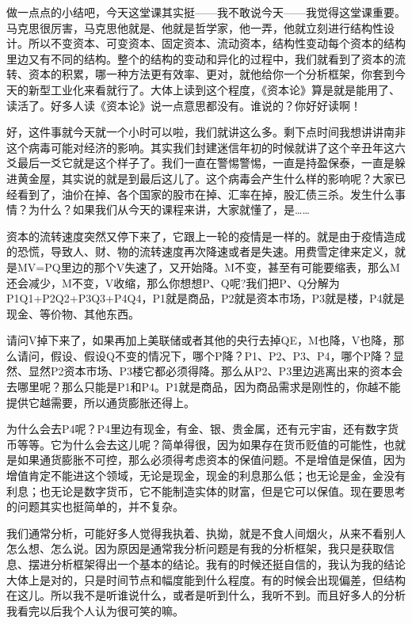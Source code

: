 \documentclass[UTF8, 12pt, a4paper]{ctexrep}
\begin{document}
做一点点的小结吧，今天这堂课其实挺——我不敢说今天——我觉得这堂课重要。马克思很厉害，马克思他就是、他就是哲学家，他一弄，他就立刻进行结构性设计。所以不变资本、可变资本、固定资本、流动资本，结构性变动每个资本的结构里边又有不同的结构。整个的结构的变动和异化的过程中，我们就看到了资本的流转、资本的积累，哪一种方法更有效率、更对，就他给你一个分析框架，你套到今天的新型工业化来看就行了。大体上读到这个程度，《资本论》算是就是能用了、读活了。好多人读《资本论》说一点意思都没有。谁说的？你好好读啊！

好，这件事就今天就一个小时可以啦，我们就讲这么多。剩下点时间我想讲讲南非这个病毒可能对经济的影响。其实我们封建迷信年初的时候就讲了这个辛丑年这六爻最后一爻它就是这个样子了。我们一直在警惕警惕，一直是持盈保泰，一直是躲进黄金屋，其实说的就是到最后这儿了。这个病毒会产生什么样的影响呢？大家已经看到了，油价在掉、各个国家的股市在掉、汇率在掉，股汇债三杀。发生什么事情？为什么？如果我们从今天的课程来讲，大家就懂了，是……

资本的流转速度突然又停下来了，它跟上一轮的疫情是一样的。就是由于疫情造成的恐慌，导致人、财、物的流转速度再次降速或者是失速。用费雪定律来定义，就是MV=PQ里边的那个V失速了，又开始降。M不变，甚至有可能要缩表，那么M还会减少，M不变，V收缩，那么你想想P、Q呢?我们把P、Q分解为P1Q1+P2Q2+P3Q3+P4Q4，P1就是商品，P2就是资本市场，P3就是楼，P4就是现金、等价物、其他东西。

请问V掉下来了，如果再加上美联储或者其他的央行去掉QE，M也降，V也降，那么请问，假设、假设Q不变的情况下，哪个P降？P1、P2、P3、P4，哪个P降？显然、显然P2资本市场、P3楼它都必须得降。那么从P2、P3里边逃离出来的资本会去哪里呢？那么只能是P1和P4。P1就是商品，因为商品需求是刚性的，你越不能提供它越需要，所以通货膨胀还得上。

为什么会去P4呢？P4里边有现金，有金、银、贵金属，还有元宇宙，还有数字货币等等。它为什么会去这儿呢？简单得很，因为如果存在货币贬值的可能性，也就是如果通货膨胀不可控，那么必须得考虑资本的保值问题。不是增值是保值，因为增值肯定不能进这个领域，无论是现金，现金的利息那么低；也无论是金，金没有利息；也无论是数字货币，它不能制造实体的财富，但是它可以保值。现在要思考的问题其实也挺简单的，并不复杂。

我们通常分析，可能好多人觉得我执着、执拗，就是不食人间烟火，从来不看别人怎么想、怎么说。因为原因是通常我分析问题是有我的分析框架，我只是获取信息、摆进分析框架得出一个基本的结论。我有的时候还挺自信的，我认为我的结论大体上是对的，只是时间节点和幅度能到什么程度。有的时候会出现偏差，但结构在这儿。所以我不是听谁说什么，或者是听到什么，我听不到。而且好多人的分析我看完以后我个人认为很可笑的嘛。
\end{document}
